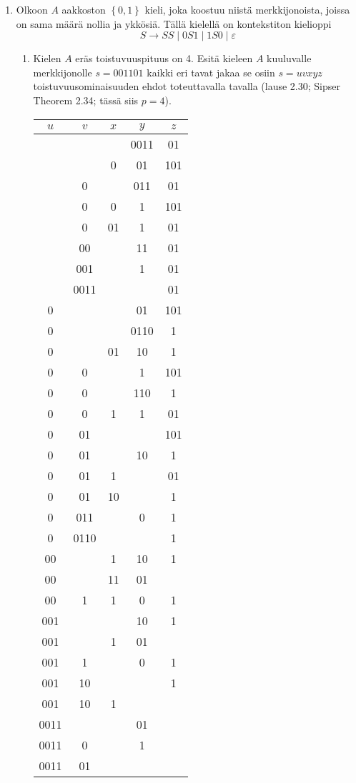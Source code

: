 \documentclass[a4paper,11pt, draft]{article}
\newcommand{\set}[1]{{\left\{ #1 \right\}}}
\newcommand{\ve}{\varepsilon}
\begin{document}
\begin{enumerate}

  \item
    Olkoon $A$ aakkoston $\set{0,1}$ kieli, joka koostuu niistä
    merkkijonoista, joissa on sama määrä nollia ja ykkösiä. Tällä kielellä on
    kontekstiton kielioppi
%
    \begin{equation*}
      S \to SS \mid 0S1 \mid 1S0 \mid \ve
    \end{equation*}
%
    \begin{enumerate}
    \item
      Kielen $A$ eräs toistuvuuspituus on 4. Esitä kieleen $A$ kuuluvalle
      merkkijonolle $s=001101$ kaikki eri tavat jakaa se osiin $s=uvxyz$
      toistuvuusominaisuuden ehdot toteuttavalla tavalla (lause 2.30; Sipser
      Theorem 2.34; tässä siis $p=4$).

      \begin{tabular}{ccccc}
          \toprule
          $u$         & $v$  & $x$ & $y$  & $z$ \tabularnewline
          \midrule
                      &      &     & 0011 & 01\tabularnewline
                      &      & 0   & 01   & 101\tabularnewline
                      & 0    &     & 011  & 01\tabularnewline
                      & 0    & 0   & 1    & 101\tabularnewline
                      & 0    & 01  & 1    & 01\tabularnewline
                      & 00   &     & 11   & 01\tabularnewline
                      & 001  &     & 1    & 01\tabularnewline
                      & 0011 &     &      & 01\tabularnewline
          0           &      &     & 01   & 101\tabularnewline
          0           &      &     & 0110 & 1\tabularnewline
          0           &      & 01  & 10   & 1\tabularnewline
          0           & 0    &     & 1    & 101\tabularnewline
          0           & 0    &     & 110  & 1\tabularnewline
          0           & 0    & 1   & 1    & 01\tabularnewline
          0           & 01   &     &      & 101\tabularnewline
          0           & 01   &     & 10   & 1\tabularnewline
          0           & 01   & 1   &      & 01\tabularnewline
          0           & 01   & 10  &      & 1\tabularnewline
          0           & 011  &     & 0    & 1\tabularnewline
          0           & 0110 &     &      & 1\tabularnewline
          00          &      & 1   & 10   & 1\tabularnewline
          00          &      & 11  & 01   & \tabularnewline
          00          & 1    & 1   & 0    & 1\tabularnewline
          001         &      &     & 10   & 1\tabularnewline
          001         &      & 1   & 01   & \tabularnewline
          001         & 1    &     & 0    & 1\tabularnewline
          001         & 10   &     &      & 1\tabularnewline
          001         & 10   & 1   &      & \tabularnewline
          0011        &      &     & 01   & \tabularnewline
          0011        & 0    &     & 1    & \tabularnewline
          0011        & 01   &     &      & \tabularnewline
          \bottomrule
      \end{tabular}


\end{enumerate}
\end{enumerate}
\end{document}

